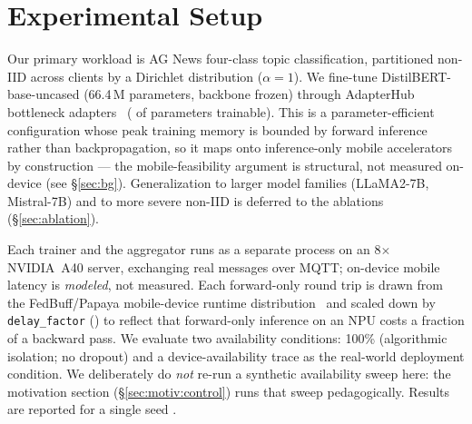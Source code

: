 \section{Experimental Setup}
\label{sec:eval:setup}

Our primary workload is AG News four-class topic classification,
partitioned non-IID across clients by a Dirichlet distribution
($\alpha = 1$).  We fine-tune DistilBERT-base-uncased
(66.4\,M parameters, backbone frozen) through AdapterHub bottleneck
adapters~\cite{houlsby2019parameter,pfeiffer2020adapterhub}
( of parameters trainable). This is a
parameter-efficient configuration whose peak training memory is
bounded by forward inference rather than backpropagation, so it maps
onto inference-only mobile accelerators by construction --- the
mobile-feasibility argument is structural, not measured on-device (see
\S\ref{sec:bg}). Generalization to larger model families (LLaMA2-7B,
Mistral-7B) and to more severe non-IID is deferred to the ablations
(\S\ref{sec:ablation}). 

Each trainer and the aggregator runs as a separate process on an
8$\times$NVIDIA~A40 server, exchanging real messages over MQTT;
on-device mobile latency is \emph{modeled}, not measured. Each
forward-only round trip is drawn from the FedBuff/Papaya mobile-device
runtime distribution~\cite{nguyen2022fedbuff} and
scaled down by \texttt{delay\_factor} () to reflect that
forward-only inference on an NPU costs a fraction of a backward pass.
  We evaluate two availability
conditions: 100\% (algorithmic isolation; no dropout) and a
 device-availability trace as the real-world deployment
condition. We deliberately do \emph{not} re-run a synthetic
availability sweep here: the motivation section
(\S\ref{sec:motiv:control}) runs that sweep pedagogically. Results are
reported for a single seed . 

